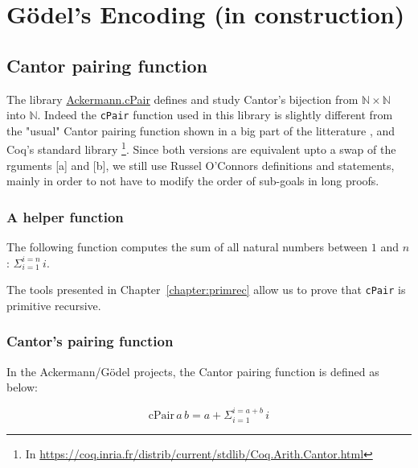 \chapter{G\"{o}del's Encoding (in construction)}
\label{chap:encoding}


\section{Cantor pairing function}

The library \href{../theories/html/hydras.Ackermann.cPair.html}{Ackermann.cPair} defines and study Cantor's bijection from
$\mathbb{N}\times\mathbb{N}$ into $\mathbb{N}$.
Indeed the \texttt{cPair} function used in this library
 is slightly different 
     from the "usual" Cantor pairing function shown in  a big part 
     of the litterature , and Coq's standard library \footnote{In 
\url{https://coq.inria.fr/distrib/current/stdlib/Coq.Arith.Cantor.html}}.
       Since both versions are equivalent upto a swap of the 
      rguments [a] and [b], we still use  Russel O'Connors definitions and statements, mainly in order to not have to modify the order of sub-goals in long proofs.


      \subsection{A helper function}

      The following function computes the sum of all natural numbers between $1$ and $n$: $\Sigma_{i=1}^{i=n}\,i$.

      


      The tools presented in Chapter~\ref{chapter:primrec} allow us to prove that \texttt{cPair} is primitive recursive.

      
      \subsection{Cantor's pairing function}

      In the Ackermann/G\"{o}del projects, the Cantor pairing function is defined as below:

      $$\textrm{cPair}\,a\,b = a+ \Sigma_{i=1}^{i=a+b}\,i$$


